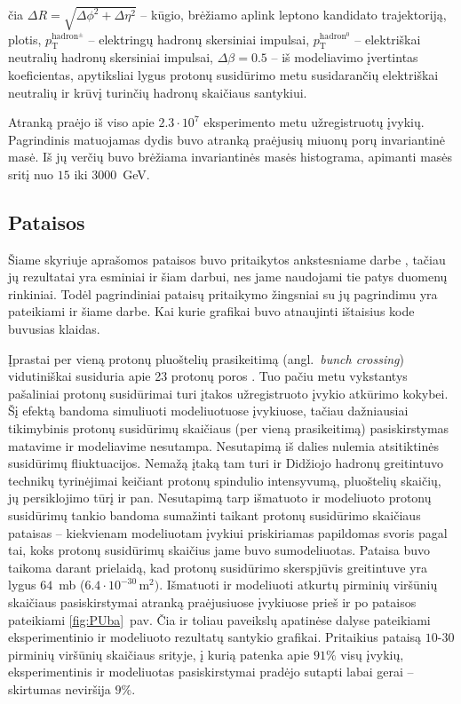\documentclass[a4paper, 12pt, oneside]{article}
\newlength\q
\begin{document}
čia $\Delta R = \sqrt{\Delta \phi^{2} + \Delta \eta^{2}}$ -- kūgio, brėžiamo aplink leptono kandidato
trajektoriją, plotis, $p_{\mathrm{T}}^{\mathrm{hadron^{\pm}}}$ -- elektringų hadronų skersiniai impulsai,
$p_{\mathrm{T}}^{\mathrm{hadron^0}}$ -- elektriškai neutralių hadronų skersiniai impulsai,
$\Delta\beta=0.5$ -- iš modeliavimo įvertintas koeficientas, apytiksliai lygus protonų susidūrimo metu
susidarančių elektriškai neutralių ir krūvį turinčių hadronų skaičiaus santykiui.

Atranką praėjo iš viso apie $2.3\cdot10^7$ eksperimento metu užregistruotų įvykių.
Pagrindinis matuojamas dydis buvo atranką praėjusių miuonų porų invariantinė masė.
Iš jų verčių buvo brėžiama invariantinės masės histograma, apimanti masės sritį nuo $15$ iki $3000$~GeV.


\subsection{Pataisos}\label{sec:corrections}
Šiame skyriuje aprašomos pataisos buvo pritaikytos ankstesniame darbe \cite{MAk2}, tačiau jų rezultatai yra
esminiai ir šiam darbui, nes jame naudojami tie patys duomenų rinkiniai.
Todėl pagrindiniai pataisų pritaikymo žingsniai su jų pagrindimu yra pateikiami ir šiame darbe.
Kai kurie grafikai buvo atnaujinti ištaisius kode buvusias klaidas.

Įprastai per vieną protonų pluoštelių prasikeitimą (angl.\ \textit{bunch crossing}) vidutiniškai susiduria
apie 23 protonų poros \cite{CMSLumi}.
Tuo pačiu metu vykstantys pašaliniai protonų susidūrimai turi įtakos užregistruoto įvykio atkūrimo kokybei.
Šį efektą bandoma simuliuoti modeliuotuose įvykiuose, tačiau dažniausiai tikimybinis protonų susidūrimų
skaičiaus (per vieną prasikeitimą) pasiskirstymas matavime ir modeliavime nesutampa.
Nesutapimą iš dalies nulemia atsitiktinės susidūrimų fliuktuacijos.
Nemažą įtaką tam turi ir Didžiojo hadronų greitintuvo technikų tyrinėjimai keičiant protonų spindulio intensyvumą,
pluoštelių skaičių, jų persiklojimo tūrį ir pan.
Nesutapimą tarp išmatuoto ir modeliuoto protonų susidūrimų tankio bandoma sumažinti taikant protonų susidūrimo
skaičiaus pataisas -- kiekvienam modeliuotam įvykiui priskiriamas papildomas svoris pagal tai, koks protonų
susidūrimų skaičius jame buvo sumodeliuotas.
Pataisa buvo taikoma darant prielaidą, kad protonų susidūrimo skerspjūvis greitintuve yra lygus $64$~mb
($6.4 \cdot 10^{-30} \, \mathrm{m}^2)$.
Išmatuoti ir modeliuoti atkurtų pirminių viršūnių skaičiaus pasiskirstymai atranką praėjusiuose įvykiuose
prieš ir po pataisos pateikiami \ref{fig:PUba}~pav.
Čia ir toliau paveikslų apatinėse dalyse pateikiami eksperimentinio ir modeliuoto rezultatų santykio grafikai.
Pritaikius pataisą $10$-$30$ pirminių viršūnių skaičiaus srityje, į kurią patenka apie $91\%$ visų įvykių,
eksperimentinis ir modeliuotas pasiskirstymai pradėjo sutapti labai gerai -- skirtumas neviršija $9\%$.
\end{document}
